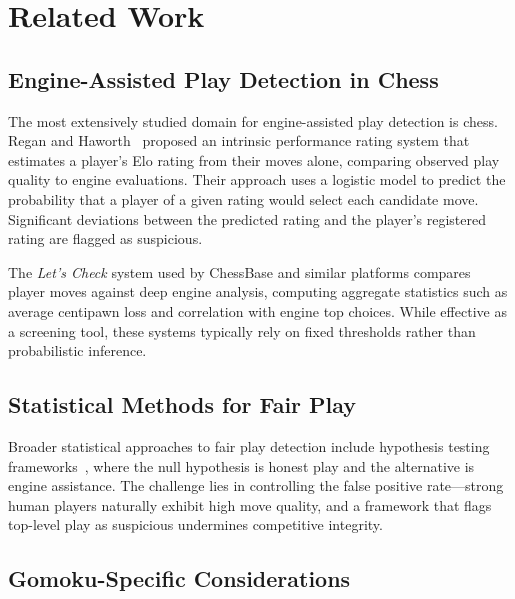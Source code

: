 \documentclass[11pt,a4paper]{article}
\begin{document}
\section{Related Work}
\label{sec:related_work}

\subsection{Engine-Assisted Play Detection in Chess}

The most extensively studied domain for engine-assisted play detection is chess.
Regan and Haworth~\citep{regan2011intrinsic} proposed an intrinsic performance
rating system that estimates a player's Elo rating from their moves alone,
comparing observed play quality to engine evaluations. Their approach uses a
logistic model to predict the probability that a player of a given rating would
select each candidate move. Significant deviations between the predicted rating
and the player's registered rating are flagged as suspicious.

The \emph{Let's Check} system used by ChessBase and similar platforms
\citep{guid2006computer} compares player moves against deep engine analysis,
computing aggregate statistics such as average centipawn loss and correlation
with engine top choices. While effective as a screening tool, these systems
typically rely on fixed thresholds rather than probabilistic inference.

\subsection{Statistical Methods for Fair Play}

Broader statistical approaches to fair play detection include hypothesis testing
frameworks~\citep{berger1987testing}, where the null hypothesis is honest play
and the alternative is engine assistance. The challenge lies in controlling the
false positive rate---strong human players naturally exhibit high move quality,
and a framework that flags top-level play as suspicious undermines competitive
integrity.

\subsection{Gomoku-Specific Considerations}
\end{document}
